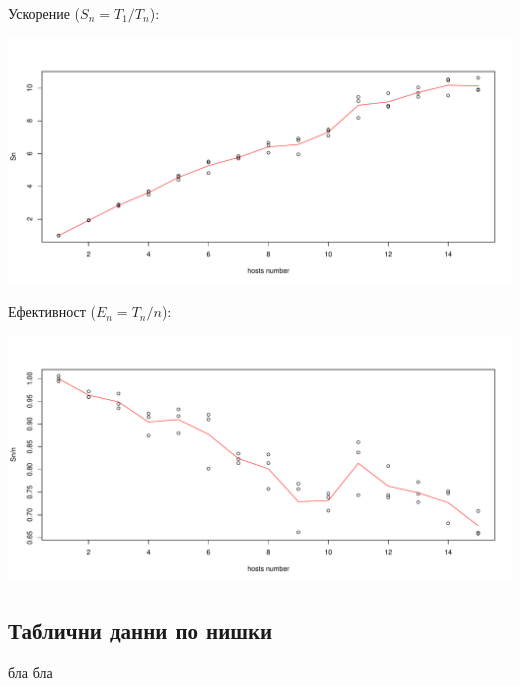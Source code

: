 \documentclass[12pt]{extarticle}
\begin{document}
Ускорение ($S_n = T_1 / T_n$):
\begin{center}
\includegraphics[width=\textwidth]{host_graphs/Sn.pdf}
\end{center}

Ефективност ($E_n = T_n / n$):
\begin{center}
\includegraphics[width=\textwidth]{host_graphs/Sn_n.pdf}
\end{center}

\subsection{Таблични данни по нишки}
бла
бла
\end{document}
